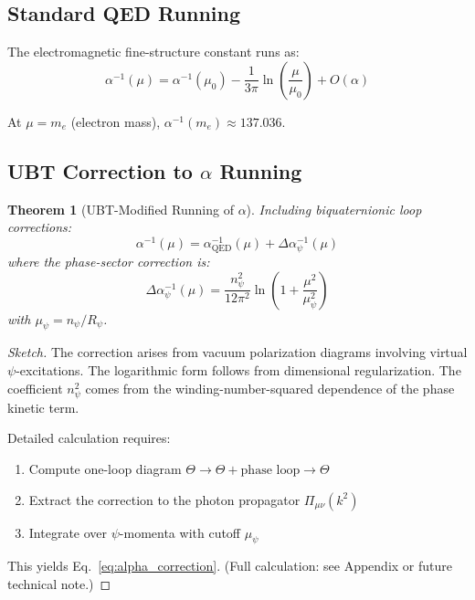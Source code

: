 \documentclass[12pt]{article}
\newtheorem{theorem}[definition]{Theorem}
\begin{document}
\subsection{Standard QED Running}

The electromagnetic fine-structure constant runs as:
\begin{equation}
\alpha^{-1}(\mu) = \alpha^{-1}(\mu_0) - \frac{1}{3\pi} \ln\left(\frac{\mu}{\mu_0}\right) + O(\alpha)
\end{equation}

At $\mu = m_e$ (electron mass), $\alpha^{-1}(m_e) \approx 137.036$.

\subsection{UBT Correction to $\alpha$ Running}

\begin{theorem}[UBT-Modified Running of $\alpha$]
Including biquaternionic loop corrections:
\begin{equation}
\alpha^{-1}(\mu) = \alpha^{-1}_{\text{QED}}(\mu) + \Delta \alpha^{-1}_{\psi}(\mu)
\label{eq:alpha_ubt}
\end{equation}
where the phase-sector correction is:
\begin{equation}
\Delta \alpha^{-1}_{\psi}(\mu) = \frac{n_\psi^2}{12\pi^2} \ln\left(1 + \frac{\mu^2}{\mu_\psi^2}\right)
\label{eq:alpha_correction}
\end{equation}
with $\mu_\psi = n_\psi / R_\psi$.
\end{theorem}

\begin{proof}[Sketch]
The correction arises from vacuum polarization diagrams involving virtual $\psi$-excitations. The logarithmic form follows from dimensional regularization. The coefficient $n_\psi^2$ comes from the winding-number-squared dependence of the phase kinetic term.

Detailed calculation requires:
\begin{enumerate}
    \item Compute one-loop diagram $\Theta \to \Theta + \text{phase loop} \to \Theta$
    \item Extract the correction to the photon propagator $\Pi_{\mu\nu}(k^2)$
    \item Integrate over $\psi$-momenta with cutoff $\mu_\psi$
\end{enumerate}
This yields Eq.~\eqref{eq:alpha_correction}. (Full calculation: see Appendix or future technical note.)
\end{proof}
\end{document}
